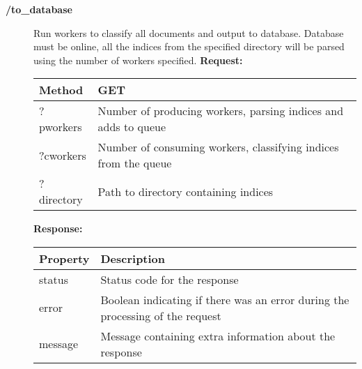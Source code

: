 \begin{description}
\item[{\large \textbf{/to\_database}}]
Run workers to classify all documents and output to database.
Database must be online, all the indices from the specified directory will be parsed using the number of workers specified.
\newline
\newline
\textbf{Request:}
\newline
\newline
\begin{tabular}{ | l | l |}
\hline
Method & GET\\ \hline
?pworkers & Number of producing workers, parsing indices and adds to queue\\ \hline
?cworkers & Number of consuming workers, classifying indices from the queue\\ \hline
?directory & Path to directory containing indices\\ \hline
\end{tabular}
\newline
\newline
\textbf{Response:}
\newline
\newline
\begin{tabular}{ | l | l |}
\hline
\textbf{Property} & \textbf{Description}\\ \hline
status & Status code for the response\\ \hline
error & Boolean indicating if there was an error during the processing of the request\\ \hline
message & Message containing extra information about the response\\ \hline
\end{tabular}\\

\end{description}